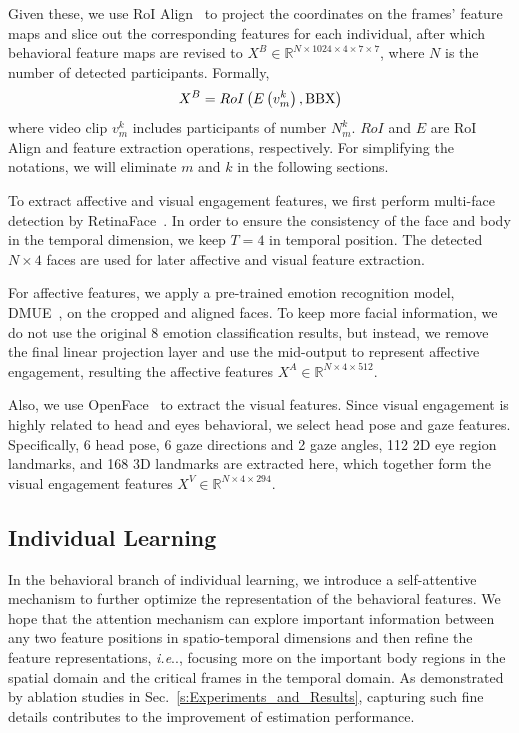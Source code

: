 \documentclass[twocolumn]{svjour3}
\makeatletter
\DeclareRobustCommand\onedot{\futurelet\@let@token\@onedot}
\def\@onedot{\ifx\@let@token.\else.\null\fi\xspace}
\def\ie{\emph{i.e}\onedot} \def\Ie{\emph{I.e}\onedot}
\makeatother
\begin{document}
Given these, we use RoI Align~\cite{He2017Mask} to project the coordinates on the frames' feature maps and slice out the corresponding features for each individual, after which behavioral feature maps are revised to $X^B \in \mathbb{R}^{N\times1024\times4\times7\times7}$, where $N$ is the number of detected participants. Formally,
\begin{equation}
  X^B = RoI\left(E\left(v_m^k\right), {\rm BBX}\right)
\end{equation}
where video clip $v_m^k$ includes participants of number $N_m^k$. $RoI$ and $E$ are RoI Align and feature extraction operations, respectively. For simplifying the notations, we will eliminate $m$ and $k$ in the following sections.

To extract affective and visual engagement features, we first perform multi-face detection by RetinaFace~\cite{Deng2020RetinaFace}. In order to ensure the consistency of the face and body in the temporal dimension, we keep $T = 4$ in temporal position. The detected $N\times4$ faces are used for later affective and visual feature extraction.

For affective features, we apply a pre-trained emotion recognition model, DMUE~\cite{She2021Dive}, on the cropped and aligned faces. To keep more facial information, we do not use the original 8 emotion classification results, but instead, we remove the final linear projection layer and use the mid-output to represent affective engagement, resulting the affective features $X^A \in \mathbb{R}^{N\times4\times512}$.

Also, we use OpenFace~\cite{Baltrusaitis2018OpenFace} to extract the visual features. Since visual engagement is highly related to head and eyes behavioral, we select head pose and gaze features. Specifically, 6 head pose, 6 gaze directions and 2 gaze angles, 112 2D eye region landmarks, and 168 3D landmarks are extracted here, which together form the visual engagement features $X^V \in \mathbb{R}^{N\times4\times294}$.

\subsection{Individual Learning}
\label{subs:Individual_Learning}

In the behavioral branch of individual learning, we introduce a self-attentive mechanism to further optimize the representation of the behavioral features. We hope that the attention mechanism can explore important information between any two feature positions in spatio-temporal dimensions and then refine the feature representations, \ie, focusing more on the important body regions in the spatial domain and the critical frames in the temporal domain. As demonstrated by ablation studies in Sec.~\ref{s:Experiments_and_Results}, capturing such fine details contributes to the improvement of estimation performance.
\end{document}
